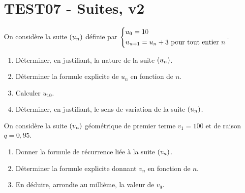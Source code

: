 \documentclass[a4paper,11pt]{article}
\author{Pierquet}
\title{\nomfichier}
\begin{document}
\pagestyle{fancy}


\part{TEST07 - Suites, v2}%

\setcounter{numexos}{0}

\medskip

\nomprenomtcbox

\medskip

\exonum{}

\medskip

On considère la suite $\suiten$ définie par $\begin{dcases} u_0 = 10 \\ u_{n+1} = u_n + 3 \text{ pour tout entier }n \end{dcases}$.

\begin{enumerate}
	\item Déterminer, en justifiant, la nature de la suite $\suiten$.
	\item Déterminer la formule explicite de $u_n$ en fonction de $n$.
	\item Calculer $u_{10}$.
	\item Déterminer, en justifiant, le sens de variation de la suite $\suiten$.
\end{enumerate}


\medskip

\exonum{}

\medskip

On considère la suite $\suiten[v]$ géométrique de premier terme $v_1=100$ et de raison $q=0,95$.

\begin{enumerate}
	\item Donner la formule de récurrence liée à la suite $\suiten[v]$.
	\item Déterminer la formule explicite donnant $v_n$ en fonction de $n$.
	\item En déduire, arrondie au millième, la valeur de $v_9$.
\end{enumerate}

\end{document}
